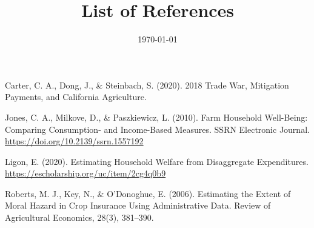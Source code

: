 \documentclass[11pt]{article}
\date{\today}
\title{List of References}
\begin{document}
\maketitle
Carter, C. A., Dong, J., \& Steinbach, S. (2020). 2018 Trade War, Mitigation Payments, and California Agriculture.

Jones, C. A., Milkove, D., \& Paszkiewicz, L. (2010). Farm Household Well-Being: Comparing Consumption- and Income-Based Measures. SSRN Electronic Journal. \url{https://doi.org/10.2139/ssrn.1557192}

Ligon, E. (2020). Estimating Household Welfare from Disaggregate Expenditures. \url{https://escholarship.org/uc/item/2cg4q0b9}

Roberts, M. J., Key, N., \& O’Donoghue, E. (2006). Estimating the Extent of Moral Hazard in Crop Insurance Using Administrative Data. Review of Agricultural Economics, 28(3), 381–390.
\end{document}
